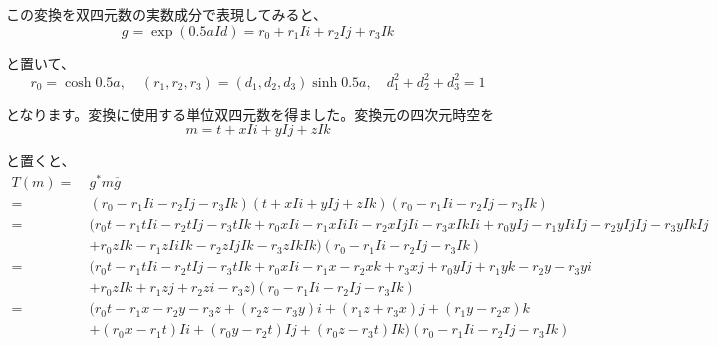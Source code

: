 \documentclass[a4paper,12pt]{jsreport}
\begin{document}
この変換を双四元数の実数成分で表現してみると、
\begin{equation}
g=\exp(0.5aId)=r_0+r_1Ii+r_2Ij+r_3Ik
\end{equation}

と置いて、
\begin{equation}
r_0=\cosh 0.5a,\quad (r_1,r_2,r_3)=(d_1,d_2,d_3)\sinh 0.5a,\quad d_1^2+d_2^2+d_3^2=1
\end{equation}

となります。変換に使用する単位双四元数を得ました。変換元の四次元時空を
\begin{equation}
m=t+xIi+yIj+zIk
\end{equation}

と置くと、
\begin{equation}
\begin{split}
T(m)=~&g^*m\overline{g}\\
=~&(r_0-r_1Ii-r_2Ij-r_3Ik)(t+xIi+yIj+zIk)(r_0-r_1Ii-r_2Ij-r_3Ik)\\
=~&(r_0t-r_1tIi-r_2tIj-r_3tIk+r_0xIi-r_1xIiIi-r_2xIjIi-r_3xIkIi+r_0yIj-r_1yIiIj-r_2yIjIj-r_3yIkIj\\
&+r_0zIk-r_1zIiIk-r_2zIjIk-r_3zIkIk)(r_0-r_1Ii-r_2Ij-r_3Ik)\\
=~&(r_0t-r_1tIi-r_2tIj-r_3tIk+r_0xIi-r_1x-r_2xk+r_3xj+r_0yIj+r_1yk-r_2y-r_3yi\\
&+r_0zIk+r_1zj+r_2zi-r_3z)(r_0-r_1Ii-r_2Ij-r_3Ik)\\
=~&(r_0t-r_1x-r_2y-r_3z+(r_2z-r_3y)i+(r_1z+r_3x)j+(r_1y-r_2x)k\\
&+(r_0x-r_1t)Ii+(r_0y-r_2t)Ij+(r_0z-r_3t)Ik)(r_0-r_1Ii-r_2Ij-r_3Ik)\\
\end{split}
\end{equation}
\end{document}

